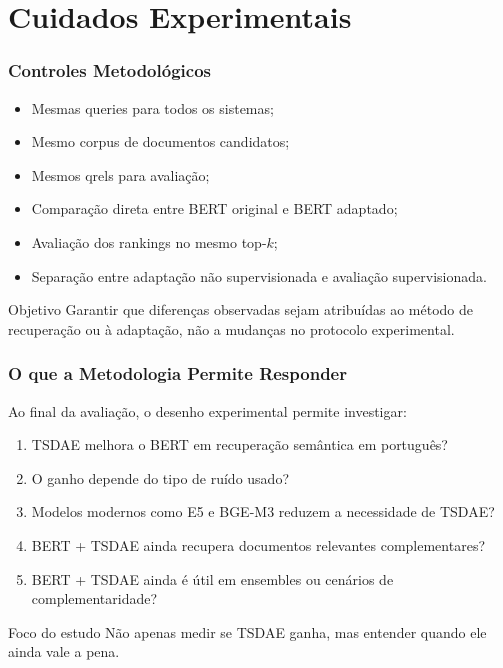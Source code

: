 \documentclass[aspectratio=169]{beamer}
\begin{document}
\section{Cuidados Experimentais}

\begin{frame}
\frametitle{Controles Metodológicos}

\begin{itemize}
  \item Mesmas queries para todos os sistemas;
  \item Mesmo corpus de documentos candidatos;
  \item Mesmos qrels para avaliação;
  \item Comparação direta entre BERT original e BERT adaptado;
  \item Avaliação dos rankings no mesmo top-$k$;
  \item Separação entre adaptação não supervisionada e avaliação supervisionada.
\end{itemize}

\vspace{0.3cm}

\begin{alertblock}{Objetivo}
Garantir que diferenças observadas sejam atribuídas ao método de recuperação ou à adaptação, não a mudanças no protocolo experimental.
\end{alertblock}

\end{frame}

\begin{frame}
\frametitle{O que a Metodologia Permite Responder}

Ao final da avaliação, o desenho experimental permite investigar:

\vspace{0.2cm}

\begin{enumerate}
  \item TSDAE melhora o BERT em recuperação semântica em português?
  \item O ganho depende do tipo de ruído usado?
  \item Modelos modernos como E5 e BGE-M3 reduzem a necessidade de TSDAE?
  \item BERT + TSDAE ainda recupera documentos relevantes complementares?
  \item BERT + TSDAE ainda é útil em ensembles ou cenários de complementaridade?
\end{enumerate}

\vspace{0.3cm}

\begin{block}{Foco do estudo}
Não apenas medir se TSDAE ganha, mas entender quando ele ainda vale a pena.
\end{block}

\end{frame}
\end{document}
